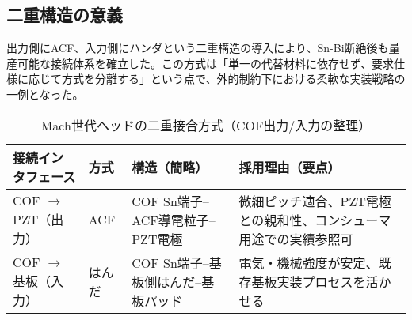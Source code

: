 \documentclass[conference]{IEEEtran}
\begin{document}
\subsection{二重構造の意義}
出力側にACF、入力側にハンダという二重構造の導入により、Sn-Bi断絶後も量産可能な接続体系を確立した。この方式は「単一の代替材料に依存せず、要求仕様に応じて方式を分離する」という点で、外的制約下における柔軟な実装戦略の一例となった。

\begin{table}[t]
\centering
\footnotesize
\caption{Mach世代ヘッドの二重接合方式（COF出力/入力の整理）}
\label{tab:dual-bond}
\renewcommand{\arraystretch}{1.1}
\begin{tabularx}{\columnwidth}{@{}p{1.95cm} p{1.25cm} Y Y@{}}
\toprule
接続インタフェース & 方式 & 構造（簡略） & 採用理由（要点） \\
\midrule
COF $\rightarrow$ PZT（出力） & ACF &
COF Sn端子–ACF導電粒子–PZT電極 &
微細ピッチ適合、PZT電極との親和性、コンシューマ用途での実績参照可 \\
\addlinespace[2pt]
COF $\rightarrow$ 基板（入力） & はんだ &
COF Sn端子–基板側はんだ–基板パッド &
電気・機械強度が安定、既存基板実装プロセスを活かせる \\
\bottomrule
\end{tabularx}
\end{table}
\end{document}
